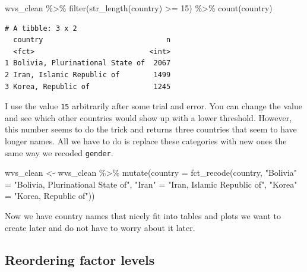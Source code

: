 \documentclass[
  letterpaper,
]{krantz}
\makeatletter
\newenvironment{Shaded}{\begin{snugshade}}{\end{snugshade}}
\newcommand{\AttributeTok}[1]{\textcolor[rgb]{0.40,0.45,0.13}{#1}}
\newcommand{\DecValTok}[1]{\textcolor[rgb]{0.68,0.00,0.00}{#1}}
\newcommand{\FunctionTok}[1]{\textcolor[rgb]{0.28,0.35,0.67}{#1}}
\newcommand{\NormalTok}[1]{\textcolor[rgb]{0.00,0.23,0.31}{#1}}
\newcommand{\OtherTok}[1]{\textcolor[rgb]{0.00,0.23,0.31}{#1}}
\newcommand{\SpecialCharTok}[1]{\textcolor[rgb]{0.37,0.37,0.37}{#1}}
\newcommand{\StringTok}[1]{\textcolor[rgb]{0.13,0.47,0.30}{#1}}
\newenvironment{kframe}{%
\medskip{}
\setlength{\fboxsep}{.8em}
 \def\at@end@of@kframe{}%
 \ifinner\ifhmode%
  \def\at@end@of@kframe{\end{minipage}}%
  \begin{minipage}{\columnwidth}%
 \fi\fi%
 \def\FrameCommand##1{\hskip\@totalleftmargin \hskip-\fboxsep
 \colorbox{shadecolor}{##1}\hskip-\fboxsep
     \hskip-\linewidth \hskip-\@totalleftmargin \hskip\columnwidth}%
 \MakeFramed {\advance\hsize-\width
   \@totalleftmargin\z@ \linewidth\hsize
   \@setminipage}}%
 {\par\unskip\endMakeFramed%
 \at@end@of@kframe}
\renewenvironment{Shaded}{\begin{kframe}}{\end{kframe}}
\makeatother
\begin{document}
\begin{Shaded}
\begin{Highlighting}[]
\NormalTok{wvs\_clean }\SpecialCharTok{\%\textgreater{}\%}
  \FunctionTok{filter}\NormalTok{(}\FunctionTok{str\_length}\NormalTok{(country) }\SpecialCharTok{\textgreater{}=} \DecValTok{15}\NormalTok{) }\SpecialCharTok{\%\textgreater{}\%}
  \FunctionTok{count}\NormalTok{(country)}
\end{Highlighting}
\end{Shaded}

\begin{verbatim}
# A tibble: 3 x 2
  country                             n
  <fct>                           <int>
1 Bolivia, Plurinational State of  2067
2 Iran, Islamic Republic of        1499
3 Korea, Republic of               1245
\end{verbatim}

I use the value \texttt{15} arbitrarily after some trial and error. You
can change the value and see which other countries would show up with a
lower threshold. However, this number seems to do the trick and returns
three countries that seem to have longer names. All we have to do is
replace these categories with new ones the same way we recoded
\texttt{gender}.

\begin{Shaded}
\begin{Highlighting}[]
\NormalTok{wvs\_clean }\OtherTok{\textless{}{-}}
\NormalTok{  wvs\_clean }\SpecialCharTok{\%\textgreater{}\%}
  \FunctionTok{mutate}\NormalTok{(}\AttributeTok{country =} \FunctionTok{fct\_recode}\NormalTok{(country,}
                              \StringTok{"Bolivia"} \OtherTok{=} \StringTok{"Bolivia, Plurinational State of"}\NormalTok{,}
                              \StringTok{"Iran"} \OtherTok{=} \StringTok{"Iran, Islamic Republic of"}\NormalTok{,}
                              \StringTok{"Korea"} \OtherTok{=} \StringTok{"Korea, Republic of"}\NormalTok{))}
\end{Highlighting}
\end{Shaded}

Now we have country names that nicely fit into tables and plots we want
to create later and do not have to worry about it later.

\subsection{Reordering factor levels}\label{reordering-factor-levels}
\end{document}
